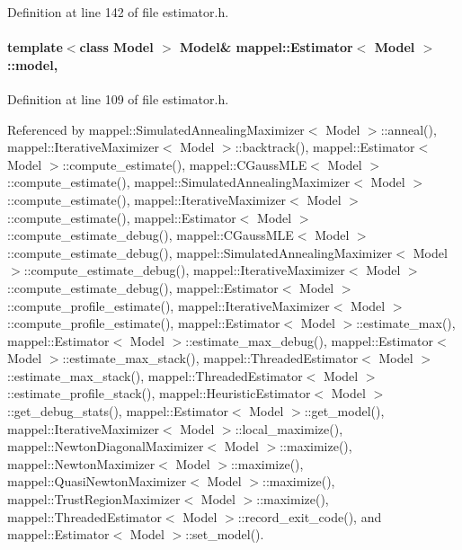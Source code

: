 Definition at line 142 of file estimator.\+h.

\paragraph[{\texorpdfstring{model}{model}}]{\setlength{\rightskip}{0pt plus 5cm}template$<$class Model $>$ Model\& {\bf mappel\+::\+Estimator}$<$ Model $>$\+::model\hspace{0.3cm}{\ttfamily [protected]}, {\ttfamily [inherited]}}\hypertarget{classmappel_1_1Estimator_a8322546d87ccdf01f8b0dcd9dae509f0}{}\label{classmappel_1_1Estimator_a8322546d87ccdf01f8b0dcd9dae509f0}


Definition at line 109 of file estimator.\+h.



Referenced by mappel\+::\+Simulated\+Annealing\+Maximizer$<$ Model $>$\+::anneal(), mappel\+::\+Iterative\+Maximizer$<$ Model $>$\+::backtrack(), mappel\+::\+Estimator$<$ Model $>$\+::compute\+\_\+estimate(), mappel\+::\+C\+Gauss\+M\+L\+E$<$ Model $>$\+::compute\+\_\+estimate(), mappel\+::\+Simulated\+Annealing\+Maximizer$<$ Model $>$\+::compute\+\_\+estimate(), mappel\+::\+Iterative\+Maximizer$<$ Model $>$\+::compute\+\_\+estimate(), mappel\+::\+Estimator$<$ Model $>$\+::compute\+\_\+estimate\+\_\+debug(), mappel\+::\+C\+Gauss\+M\+L\+E$<$ Model $>$\+::compute\+\_\+estimate\+\_\+debug(), mappel\+::\+Simulated\+Annealing\+Maximizer$<$ Model $>$\+::compute\+\_\+estimate\+\_\+debug(), mappel\+::\+Iterative\+Maximizer$<$ Model $>$\+::compute\+\_\+estimate\+\_\+debug(), mappel\+::\+Estimator$<$ Model $>$\+::compute\+\_\+profile\+\_\+estimate(), mappel\+::\+Iterative\+Maximizer$<$ Model $>$\+::compute\+\_\+profile\+\_\+estimate(), mappel\+::\+Estimator$<$ Model $>$\+::estimate\+\_\+max(), mappel\+::\+Estimator$<$ Model $>$\+::estimate\+\_\+max\+\_\+debug(), mappel\+::\+Estimator$<$ Model $>$\+::estimate\+\_\+max\+\_\+stack(), mappel\+::\+Threaded\+Estimator$<$ Model $>$\+::estimate\+\_\+max\+\_\+stack(), mappel\+::\+Threaded\+Estimator$<$ Model $>$\+::estimate\+\_\+profile\+\_\+stack(), mappel\+::\+Heuristic\+Estimator$<$ Model $>$\+::get\+\_\+debug\+\_\+stats(), mappel\+::\+Estimator$<$ Model $>$\+::get\+\_\+model(), mappel\+::\+Iterative\+Maximizer$<$ Model $>$\+::local\+\_\+maximize(), mappel\+::\+Newton\+Diagonal\+Maximizer$<$ Model $>$\+::maximize(), mappel\+::\+Newton\+Maximizer$<$ Model $>$\+::maximize(), mappel\+::\+Quasi\+Newton\+Maximizer$<$ Model $>$\+::maximize(), mappel\+::\+Trust\+Region\+Maximizer$<$ Model $>$\+::maximize(), mappel\+::\+Threaded\+Estimator$<$ Model $>$\+::record\+\_\+exit\+\_\+code(), and mappel\+::\+Estimator$<$ Model $>$\+::set\+\_\+model().

